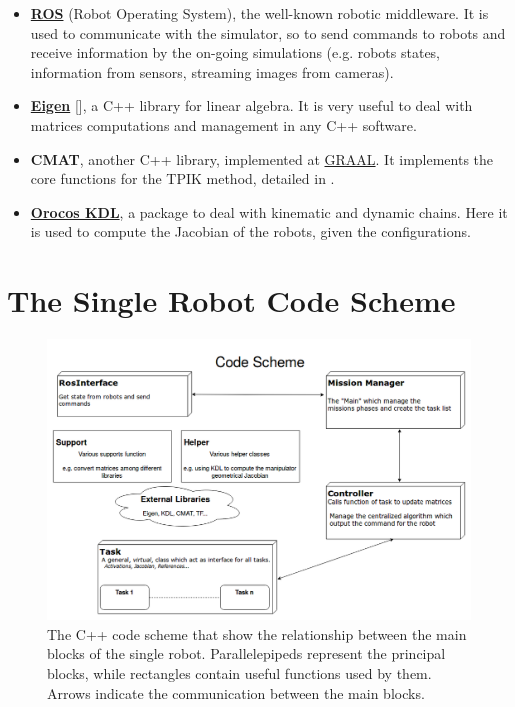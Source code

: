 \begin{itemize}
	\item \href{http://www.ros.org/}{\textbf{ROS}} (Robot Operating System), the well-known robotic middleware. It is used to communicate with the simulator, so to send commands to robots and receive information by the on-going simulations (e.g. robots states, information from sensors, streaming images from cameras).
	
	\item \href{http://eigen.tuxfamily.org/index.php?title=Main_Page}{\textbf{Eigen}} [\cite{eigen}], a C++ library for linear algebra. It is very useful to deal with matrices computations and management in any C++ software.
	
	\item \textbf{CMAT}, another C++ library, implemented at \href{http://www.graal.dibris.unige.it/}{GRAAL}. It implements the core functions for the TPIK method, detailed in \cite{IntroMaris1}.
	
	\item \href{http://www.orocos.org/kdl}{\textbf{Orocos KDL}}, a package to deal with kinematic and dynamic chains. Here it is used to compute the Jacobian of the robots, given the configurations.
\end{itemize}

\section{The Single Robot Code Scheme}
\begin{figure}[H]
	\begin{center}
		\includegraphics[width=1\columnwidth]{CodeScheme_single.png}
		\caption[C++ Code Scheme for the single robot]{The C++ code scheme that show the relationship between the main blocks of the single robot. Parallelepipeds represent the principal blocks, while rectangles contain useful functions used by them. Arrows indicate the communication between the main blocks.}
		\label{fig:codeSchemeSingle}
	\end{center}
\end{figure}

